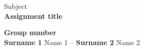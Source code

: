 \documentclass[english, 11pt]{article}
\begin{document}
	\begin{center}
		\Large Subject\\
		\huge \textbf{Assignment title}\\[3mm]
		\begin{framed}
			\Large \textbf{Group number} \\[2mm]
			\normalsize \textbf{Surname 1} Name 1 --  \textbf{Surname 2} Name 2 
		\end{framed}
	\end{center}	
	\FloatBarrier
	
	
	
	
		
\end{document}
